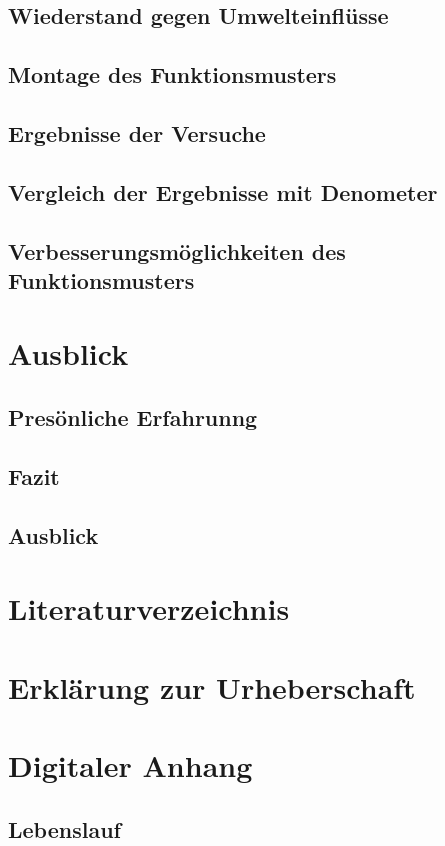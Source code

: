 \documentclass[a4paper,12pt]{article}
\begin{document}
\subsection{Wiederstand gegen Umwelteinflüsse}

\subsection{Montage des Funktionsmusters}

\subsection{Ergebnisse der Versuche}

\subsection{Vergleich der Ergebnisse mit Denometer}

\subsection{Verbesserungsmöglichkeiten des Funktionsmusters}

\newpage
\section{Ausblick}
\subsection{Presönliche Erfahrunng}

\subsection{Fazit}

\subsection{Ausblick}


\newpage
%
\section{Literaturverzeichnis}


\newpage
\section{Erklärung zur Urheberschaft}


\newpage
\listoffigures


\listoftables %
\newpage
\section{Digitaler Anhang}

\subsection*{Lebenslauf}

\end{document}
